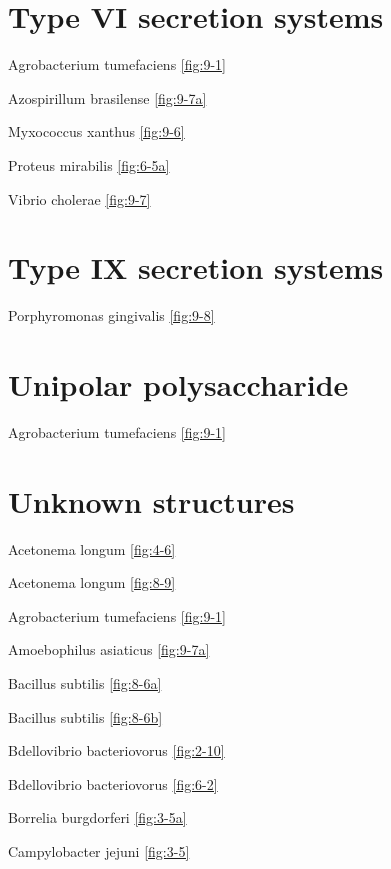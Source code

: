 \documentclass[]{tufte-book}
\begin{document}
\section*{Type VI secretion systems}\label{type-vi-secretion-systems}

Agrobacterium tumefaciens \ref{fig:9-1}

Azospirillum brasilense \ref{fig:9-7a}

Myxococcus xanthus \ref{fig:9-6}

Proteus mirabilis \ref{fig:6-5a}

Vibrio cholerae \ref{fig:9-7}

\section*{Type IX secretion systems}\label{type-ix-secretion-systems}

Porphyromonas gingivalis \ref{fig:9-8}

\section*{Unipolar polysaccharide}\label{unipolar-polysaccharide}

Agrobacterium tumefaciens \ref{fig:9-1}

\section*{Unknown structures}\label{unknown-structures}

Acetonema longum \ref{fig:4-6}

Acetonema longum \ref{fig:8-9}

Agrobacterium tumefaciens \ref{fig:9-1}

Amoebophilus asiaticus \ref{fig:9-7a}

Bacillus subtilis \ref{fig:8-6a}

Bacillus subtilis \ref{fig:8-6b}

Bdellovibrio bacteriovorus \ref{fig:2-10}

Bdellovibrio bacteriovorus \ref{fig:6-2}

Borrelia burgdorferi \ref{fig:3-5a}

Campylobacter jejuni \ref{fig:3-5}
\end{document}
